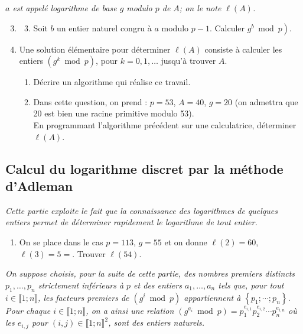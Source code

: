 \documentclass[landscape,twocolumn,leqno,a4paper,10pt]{report} %
\newcommand\n{\noindent}
\begin{document}
\n \textit{$a$ est appelé logarithme de base $g$ modulo $p$ de $A$; on le note $\ell(A)$.}

\begin{enumerate}\setcounter{enumi}{2}
	\item[]	\begin{enumerate}\setcounter{enumii}{2}
		\item Soit $b$ un entier naturel congru à $a$ modulo $p-1$. Calculer $\left.g^{b} \bmod p\right)$.
	\end{enumerate}
	\item Une solution élémentaire pour déterminer $\ell(A)$ consiste à calculer les entiers $\left(g^{k} \bmod p\right)$, pour $k=0,1, \ldots$ jusqu'à trouver $A$.
	\begin{enumerate}
		\item Décrire un algorithme qui réalise ce travail.
		\item Dans cette question, on prend : $p=53$, $A=40$, $g=20$ (on admettra que 20 est bien une racine primitive modulo 53).\\
		En programmant l'algorithme précédent sur une calculatrice, déterminer $\ell(A)$.
	\end{enumerate}
\end{enumerate}


\subsection{Calcul du logarithme discret par la méthode d'Adleman}
 
\n \textit{Cette partie exploite le fait que la connaissance des logarithmes de quelques entiers permet de déterminer rapidement le logarithme de tout entier.}

\begin{enumerate}
	\item On se place dans le cas $p=113$, $g=55$ et on donne $\ell(2)=60$, $\ell(3)=5=$. Trouver $\ell(54)$.
\end{enumerate}

\n \textit{On suppose choisis, pour la suite de cette partie, des nombres premiers distincts $p_{1}, \ldots, p_{n}$ strictement inférieurs à $p$ et des entiers $a_{1}, \ldots, a_{n}$ tels que, pour tout $i \in\llbracket 1 ; n\rrbracket$, les facteurs premiers de $\left(g^{i} \bmod p\right)$ appartiennent à $\left\{p_{1} ; \cdots ; p_{n}\right\}$.\\
Pour chaque $i \in\llbracket 1 ; n\rrbracket$, on a ainsi une relation $\left(g^{a_{i}} \bmod p\right)=p_{1}^{e_{i, 1}} p_{2}^{e_{i, 2}} \cdots p_{n}^{e_{i, n}}$ où les $e_{i, j}$ pour $(i, j) \in\llbracket 1 ; n\rrbracket^{2}$, sont des entiers naturels.}
\end{document}
